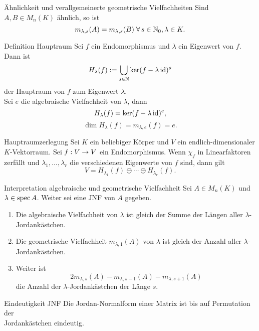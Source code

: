 \documentclass[main.tex]{subfiles}
\begin{document}
\begin{karte}{Ähnlichkeit und verallgemeinerte geometrische Vielfachheiten}
    Sind \(A, B \in M_n(K)\) ähnlich, so ist
    \[ m_{\lambda, s}(A) = m_{\lambda, s}(B) \; \forall s \in \N_0, \lambda \in K. \]
\end{karte}

\begin{karte}{Definition Hauptraum}
    Sei \(f\) ein Endomorphismus und \(\lambda\) ein Eigenwert von \(f\). Dann ist
    \[ H_\lambda(f) := \bigcup_{s \in \mathbb{N}} \ker (f-\lambda \operatorname{id})^s \]
    der Hauptraum von \(f\) zum Eigenwert \(\lambda\).\\
    Sei \(e\) die algebraische Vielfachheit von \(\lambda\), dann
    \[ H_\lambda(f) = \ker(f-\lambda\operatorname{id})^e, \]
    \[ \dim H_\lambda(f) = m_{\lambda, e}(f) = e. \]
\end{karte}

\begin{karte}{Hauptraumzerlegung}
    Sei \(K\) ein beliebiger Körper und \(V\) ein endlich-dimensionaler \(K\)-Vektorraum.
    Sei \(f : V \rightarrow V\) ein Endomorphismus. Wenn \(\chi_f\) in Linearfaktoren
    zerfällt und \(\lambda_1, \ldots, \lambda_r\) die verschiedenen Eigenwerte
    von \(f\) sind, dann gilt
    \[ V = H_{\lambda_1}(f) \oplus \cdots \oplus H_{\lambda_r}(f). \]
\end{karte}

\begin{karte}{Interpretation algebraische und geometrische Vielfachheit}
    Sei \(A \in M_n(K)\) und \(\lambda \in \operatorname{spec} A\). Weiter sei eine JNF von \(A\)
    gegeben.
    \begin{enumerate}
        \item Die algebraische Vielfachheit von \(\lambda\) ist gleich der Summe der
        Längen aller \(\lambda\)-Jordankästchen.
        \item Die geometrische Vielfachheit \(m_{\lambda,1}(A)\) von \(\lambda\) ist
        gleich der Anzahl aller \(\lambda\)-Jordankästchen.
        \item Weiter ist
        \[ 2m_{\lambda, s}(A)-m_{\lambda, s-1}(A) - m_{\lambda,s+1}(A) \]
        die Anzahl der \(\lambda\)-Jordankästchen der Länge \(s\).
    \end{enumerate}
\end{karte}

\begin{karte}{Eindeutigkeit JNF}
    Die Jordan-Normalform einer Matrix ist bis auf Permutation der \\
    Jordankästchen eindeutig.
\end{karte}
\end{document}
